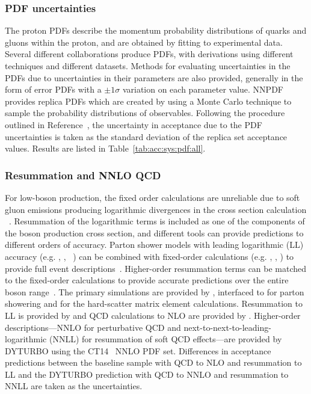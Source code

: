 \subsubsection{PDF uncertainties}
The proton PDFs describe the momentum probability distributions of quarks and gluons within the proton, and are obtained by fitting to experimental data. Several different collaborations produce PDFs, with derivations using different techniques and different datasets. Methods for evaluating uncertainties in the PDFs due to uncertainties in their parameters are also provided, generally in the form of error PDFs with a $\pm 1 \sigma$ variation on each parameter value. NNPDF provides replica PDFs which are created by using a Monte Carlo technique to sample the probability distributions of observables. Following the procedure outlined in Reference~\cite{Butterworth:2015oua}, the uncertainty in acceptance due to the PDF uncertainties is taken as the standard deviation of the replica set acceptance values. Results are listed in Table~\ref{tab:acc:sys:pdf:all}.

\subsubsection{Resummation and NNLO QCD}\label{ch:resummation}
For low-\pt boson production, the fixed order calculations are unreliable due to soft gluon emissions producing logarithmic divergences in the cross section calculation
~\cite{Collins:1984kg}. Resummation of the logarithmic terms is included as one of the components of the boson production cross section, and different tools can provide predictions to different orders of accuracy. Parton shower models with leading logarithmic (LL) accuracy (e.g. \PYTHIA, \SHERPA, \HERWIG ~\cite{Sjostrand:2014zea,Gleisberg:2008ta,Bahr:2008pv}) can be combined with fixed-order calculations (e.g. \aMCATNLO, \MINLO, \POWHEG) to provide full event descriptions~\cite{Nason:2004rx,Frixione:2002ik,Alioli:2010xd,Alwall:2014hca}. Higher-order resummation terms can be matched to the fixed-order calculations to provide accurate predictions over the entire boson \pt range~\cite{Balazs:1995nz,Catani:2015vma}. 
The primary simulations are provided by \aMCATNLO, interfaced to  for parton showering and  for the hard-scatter matrix element calculations. Resummation to LL is provided by  and QCD calculations to NLO are provided by . Higher-order descriptions---NNLO for perturbative QCD and next-to-next-to-leading-logarithmic (NNLL) for resummation of soft QCD effects---are provided by DYTURBO using the CT14~\cite{Dulat:2015mca} NNLO PDF set. Differences in acceptance predictions between the baseline sample with QCD to NLO and resummation to LL and the DYTURBO prediction with QCD to NNLO and resummation to NNLL are taken as the uncertainties.

